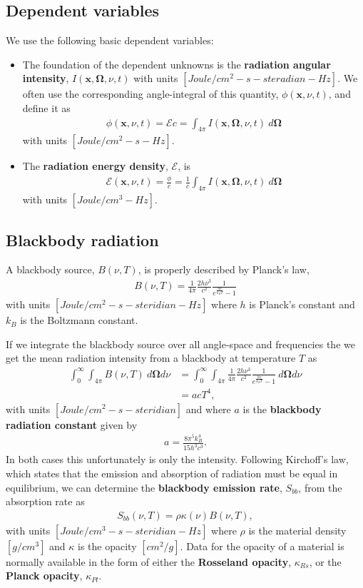 \documentclass[10pt,letterpaper,notitlepage]{article}
\newcommand{\Omegabf}{\mathbf{\Omega}}
\newcommand{\position}{\mathbf{x}}
\newcommand{\beqn}{\begin{equation}\begin{aligned}}
\newcommand{\eeqn}{\end{aligned}\end{equation}}
\newcommand{\Edensity}{\mathcal{E}}
\begin{document}
\vspace{0.5cm}
\subsection{Dependent variables}
We use the following basic dependent variables:
\begin{itemize}
\item The foundation of the dependent unknowns is the \textbf{radiation angular intensity}, $I(\position, \Omegabf, \nu,t)$ with units $[Joule/cm^2 {-} s {-} steradian {-} Hz]$. We often use the corresponding angle-integral of this quantity, $\phi(\position,\nu,t)$, and define it as
\beqn 
\phi(\position,\nu,t) = \Edensity c = \int_{4\pi} I(\position,\Omegabf,\nu,t) \ d\Omegabf
\eeqn 
with units $[Joule/cm^2 {-} s {-} Hz]$.
\item  The \textbf{radiation energy density}, $\Edensity$, is 
\beqn 
\Edensity(\position, \nu, t) = \frac{\phi}{c}  = 
\frac{1}{c} \int_{4\pi} I(\position,\Omegabf,\nu,t) \ d\Omegabf
\eeqn 
with units $[Joule/cm^3 {-} Hz]$.
\end{itemize}


\vspace{0.5cm}
\subsection{Blackbody radiation}
A blackbody source, $B(\nu,T)$, is properly described by Planck's law,
\beqn \label{eq:plancks_law}
B(\nu,T) = \frac{1}{4\pi}\frac{2h\nu^3}{c^2} \frac{1}{e^{\frac{h\nu}{k_B T}} - 1  }
\eeqn 
with units $[Joule/cm^2 {-} s {-} steridian-Hz]$ where $h$ is Planck's constant and $k_B$ is the Boltzmann constant.

If we integrate the blackbody source over all angle-space and frequencies the we get the mean radiation intensity from a blackbody at temperature $T$ as
\beqn 
\int_0^\infty \int_{4\pi}  B(\nu, T) \ d\Omegabf d\nu
&=
\int_0^\infty \int_{4\pi}  \frac{1}{4\pi}\frac{2h\nu^3}{c^2} \frac{1}{e^{\frac{h\nu}{k_B T}} - 1  } \ d\Omegabf d\nu \\
&= a c T^4,
\eeqn 
with units $[Joule/cm^2 {-} s {-} steridian]$ and where $a$ is the \textbf{blackbody radiation constant} given by
\beqn 
a = \frac{8\pi^5 k_B^4}{15 h^3 c^3}.
\eeqn 
\newline
\newline
In both cases this unfortunately is only the intensity. Following Kirchoff's law, which states that the emission and absorption of radiation must be equal in equilibrium, we can determine the \textbf{blackbody emission rate}, $S_{bb}$, from the absorption rate as
\beqn 
S_{bb}(\nu, T) = \rho \kappa(\nu) B(\nu, T),
\eeqn 
with units $[Joule/cm^3 {-} s {-} steridian {-} Hz]$
where $\rho$ is the material density $[g/cm^3]$ and $\kappa$ is the opacity $[cm^2/g]$. Data for the opacity of a material is normally available in the form of either the \textbf{Rosseland opacity}, $\kappa_{Rs}$, or the \textbf{Planck opacity}, $\kappa_{Pl}$.
\end{document}
